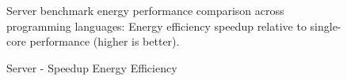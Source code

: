 \begin{figure}[h]
\caption{Server - Speedup Energy Efficiency}{Server benchmark energy performance comparison across programming languages: Energy efficiency speedup relative to single-core performance (higher is better).}
\label{fig:energy-comparison}
\end{figure}
